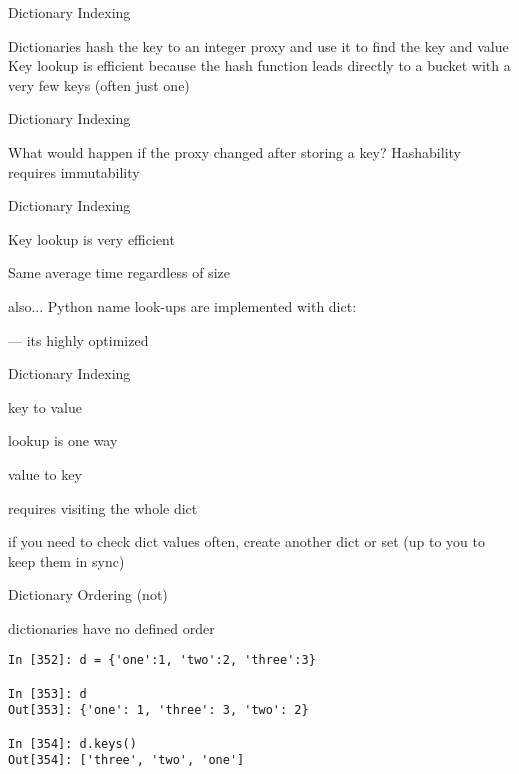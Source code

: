 \documentclass{beamer}
\begin{document}
\begin{frame}[fragile]{Dictionary Indexing}

\vfill
{\Large
Dictionaries hash the key to an integer proxy and use it to find the key and value
}
\vfill
{\Large
Key lookup is efficient because the hash function leads directly to a bucket with a very few keys (often just one)
}
\vfill
\end{frame} 

\begin{frame}[fragile]{Dictionary Indexing}

\vfill
{\Large
What would happen if the proxy changed after storing a key?
}
\vfill
{\Large
Hashability requires immutability}
\vfill
\end{frame} 

\begin{frame}[fragile]{Dictionary Indexing}

\vfill
{\Large

Key lookup is very efficient

\vfill
Same average time regardless of size
}

\vfill
also... Python name look-ups are implemented with dict:

 --- its highly optimized
\end{frame} 


\begin{frame}[fragile]{Dictionary Indexing}

\vfill
{\Large
{\center 

key to value

lookup is one way

}}
\vfill
{\Large
{\center 

value to key

requires visiting the whole dict

}}

\vfill
{\Large
if you need to check dict values often, create another dict or set (up to you to keep them in sync)

}
\vfill
\end{frame} 

\begin{frame}[fragile]{Dictionary Ordering (not)}

\vfill
{\Large
dictionaries have no defined order
}
\vfill
\begin{verbatim}
In [352]: d = {'one':1, 'two':2, 'three':3}

In [353]: d
Out[353]: {'one': 1, 'three': 3, 'two': 2}

In [354]: d.keys()
Out[354]: ['three', 'two', 'one']
\end{verbatim}
\vfill
\end{frame} 
\end{document}
